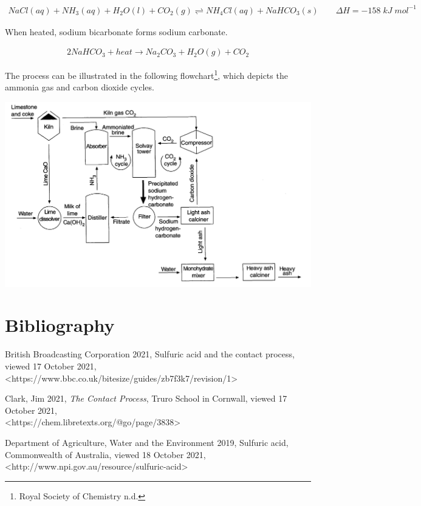 \documentclass[12pt, a4paper]{article}
\begin{document}
\begin{align}
	NaCl(aq) + NH_{3}(aq) + H_{2}O(l) + CO_{2}(g) \rightleftharpoons NH_{4}Cl(aq) + NaHCO_{3}(s)  \qquad \Delta H = -158 \; kJ \; mol^{-1}
\end{align}

When heated, sodium bicarbonate forms sodium carbonate.

\begin{align}
	2NaHCO_{3} + heat \rightarrow Na_{2}CO_{3} + H_{2}O(g) + CO_{2}
\end{align}

The process can be illustrated in the following flowchart\footnote{Royal Society of Chemistry n.d.}, which depicts the ammonia gas and carbon dioxide cycles.

\begin{center}
\includegraphics[scale=0.4]{solvay}
\end{center}



\pagebreak

\section{Bibliography}

British Broadcasting Corporation 2021, Sulfuric acid and the contact process, viewed 17 October 2021, \\ \textless{https://www.bbc.co.uk/bitesize/guides/zb7f3k7/revision/1}\textgreater

Clark, Jim 2021, \emph{The Contact Process}, Truro School in Cornwall, viewed 17 October 2021, \\ \textless{https://chem.libretexts.org/@go/page/3838}\textgreater

Department of Agriculture, Water and the Environment 2019, Sulfuric acid, Commonwealth of Australia, viewed 18 October 2021, \textless{http://www.npi.gov.au/resource/sulfuric-acid}\textgreater
\end{document}
